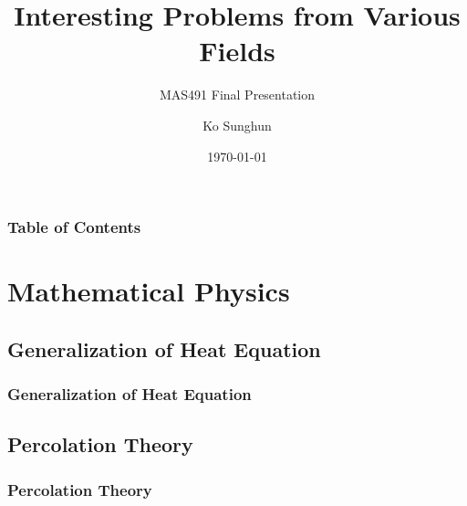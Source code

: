 \documentclass{beamer}
\title{Interesting Problems from Various Fields}
\subtitle{MAS491 Final Presentation}
\author{Ko Sunghun}
\institute{KAIST}
\date{\today}
\begin{document}
\begin{frame}
    \titlepage
\end{frame}
\begin{frame}
    \frametitle{Table of Contents}
    \tableofcontents
\end{frame}

\section{Mathematical Physics}
\subsection{Generalization of Heat Equation}
\begin{frame}
    \frametitle{Generalization of Heat Equation}
\end{frame}

\subsection{Percolation Theory}
\begin{frame}
    \frametitle{Percolation Theory}
\end{frame}
\end{document}
